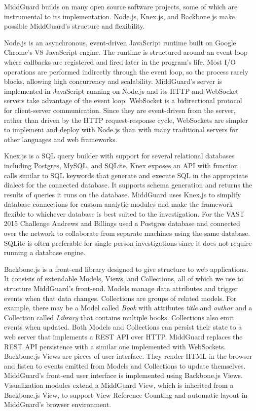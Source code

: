 \documentclass[midd]{thesis}
\begin{document}
MiddGuard builds on many open source software projects, some of which are
instrumental to its implementation. Node.js, Knex.js, and Backbone.js make
possible MiddGuard's structure and flexibility.

Node.js \cite{nodejs} is an asynchronous, event-driven JavaScript runtime built
on Google Chrome's V8 JavaScript engine. The runtime is structured around an
event loop where callbacks are registered and fired later in the program's life.
Most I/O operations are performed indirectly through the event loop, so the
process rarely blocks, allowing high concurrency and scalability. MiddGuard's
server is implemented in JavaScript running on Node.js and its HTTP and
WebSocket servers take advantage of the event loop. WebSocket is a
bidirectional protocol for client-server communication. Since they are
event-driven from the server, rather than driven by the HTTP request-response
cycle, WebSockets are simpler to implement and deploy with Node.js than with
many traditional servers for other languages and web frameworks.

Knex.js \cite{knexjs} is a SQL query builder with support for several relational
databases including Postgres, MySQL, and SQLite. Knex exposes an API with
function calls similar to SQL keywords that generate and execute SQL in the
appropriate dialect for the connected database. It supports schema generation
and returns the results of queries it runs on the database. MiddGuard uses
Knex.js to simplify database connections for custom analytic modules and make
the framework flexible to whichever database is best suited to the
investigation. For the VAST 2015 Challenge Andrews and Billings used a Postgres
database and connected over the network to collaborate from separate machines
using the same database. SQLite is often preferable for single person
investigations since it does not require running a database engine.

Backbone.js \cite{backbone} is a front-end library designed to give structure to
web applications. It consists of extendable Models, Views, and Collections, all
of which we use to structure MiddGuard's front-end. Models manage data
attributes and trigger events when that data changes. Collections are groups of
related models. For example, there may be a Model called \textit{Book} with
attributes \textit{title} and \textit{author} and a Collection called
\textit{Library} that contains multiple books. Collections also emit events when
updated. Both Models and Collections can persist their state to a web server
that implements a REST API over HTTP. MiddGuard replaces the REST API
persistence with a similar one implemented with WebSockets. Backbone.js Views
are pieces of user interface. They render HTML in the browser and listen to
events emitted from Models and Collections to update themselves. MiddGuard's
front-end user interface is implemented using Backbone.js Views. Visualization
modules extend a MiddGuard View, which is inherited from a Backbone.js View, to
support View Reference Counting and automatic layout in MiddGuard's browser
environment.
\end{document}
